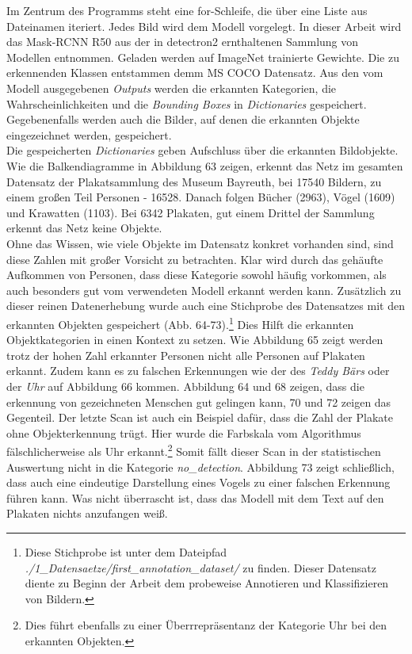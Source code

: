 \documentclass[a4paper,12pt,ngerman]{article}
\begin{document}
Im Zentrum des Programms steht eine for-Schleife, die über eine Liste aus Dateinamen iteriert. Jedes Bild wird dem Modell vorgelegt. In dieser Arbeit wird das Mask-RCNN R50 aus der in detectron2 ernthaltenen Sammlung von Modellen entnommen. Geladen werden auf ImageNet trainierte Gewichte. Die zu erkennenden Klassen entstammen demm MS COCO Datensatz. Aus den vom Modell ausgegebenen \textit{Outputs} werden die erkannten Kategorien, die Wahrscheinlichkeiten und die \textit{Bounding Boxes} in \textit{Dictionaries} gespeichert. Gegebenenfalls werden auch die Bilder, auf denen die erkannten Objekte eingezeichnet werden, gespeichert. \\
Die gespeicherten \textit{Dictionaries} geben Aufschluss über die erkannten Bildobjekte. Wie die Balkendiagramme in Abbildung 63 zeigen, erkennt das Netz im gesamten Datensatz der Plakatsammlung des Museum Bayreuth, bei 17540 Bildern, zu einem großen Teil Personen - 16528. Danach folgen Bücher (2963), Vögel (1609) und Krawatten (1103). Bei 6342 Plakaten, gut einem Drittel der Sammlung erkennt das Netz keine Objekte. \\
Ohne das Wissen, wie viele Objekte im Datensatz konkret vorhanden sind, sind diese Zahlen mit großer Vorsicht zu betrachten. Klar wird durch das gehäufte Aufkommen von Personen, dass diese Kategorie sowohl häufig vorkommen, als auch besonders gut vom verwendeten Modell erkannt werden kann. Zusätzlich zu dieser reinen Datenerhebung wurde auch eine Stichprobe des Datensatzes mit den erkannten Objekten gespeichert (Abb. 64-73).\footnote{Diese Stichprobe ist unter dem Dateipfad \textit{./1\_Datensaetze/first\_annotation\_dataset/} zu finden. Dieser Datensatz diente zu Beginn der Arbeit dem probeweise Annotieren und Klassifizieren von Bildern.} Dies Hilft die erkannten Objektkategorien in einen Kontext zu setzen. Wie Abbildung 65 zeigt werden trotz der hohen Zahl erkannter Personen nicht alle Personen auf Plakaten erkannt. Zudem kann es zu falschen Erkennungen wie der des \textit{Teddy Bärs} oder der \textit{Uhr} auf Abbildung 66 kommen. Abbildung 64 und 68 zeigen, dass die erkennung von gezeichneten Menschen gut gelingen kann, 70 und 72 zeigen das Gegenteil. Der letzte Scan ist auch ein Beispiel dafür, dass die Zahl der Plakate ohne Objekterkennung trügt. Hier wurde die Farbskala vom Algorithmus fälschlicherweise als Uhr erkannt.\footnote{Dies führt ebenfalls zu einer Überrrepräsentanz der Kategorie Uhr bei den erkannten Objekten.} Somit fällt dieser Scan in der statistischen Auswertung nicht in die Kategorie \textit{no\_detection}. Abbildung 73 zeigt schließlich, dass auch eine eindeutige Darstellung eines Vogels zu einer falschen Erkennung führen kann. Was nicht überrascht ist, dass das Modell mit dem Text auf den Plakaten nichts anzufangen weiß. \\
\end{document}
